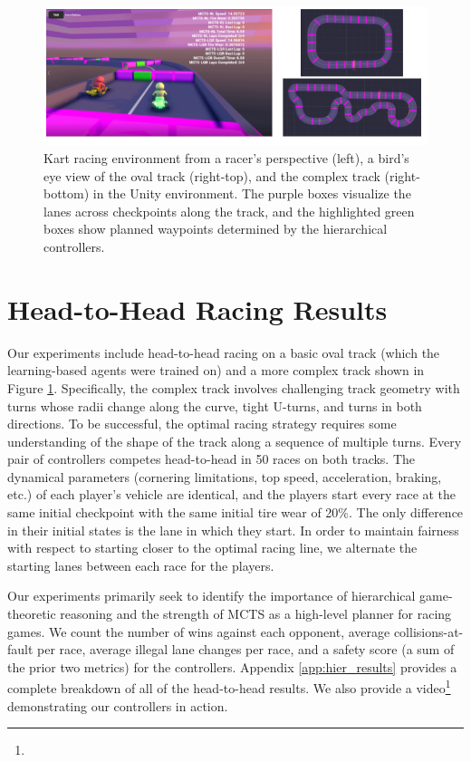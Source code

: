 \begin{figure}
  \centering
  \includegraphics[width=\textwidth]{Figures/UnityEnvironment.png}
  \caption[Screenshots of Unity simulation environment] {Kart racing environment from a racer's perspective (left), a bird's eye view of the oval track (right-top), and the complex track (right-bottom) in the Unity environment. The purple boxes visualize the lanes across checkpoints along the track, and the highlighted green boxes show planned waypoints determined by the hierarchical controllers.}
  \label{fig:experiment_tracks}
\end{figure}
\section{Head-to-Head Racing Results}
Our experiments include head-to-head racing on a basic oval track (which the learning-based agents were trained on) and a more complex track shown in Figure \ref{fig:experiment_tracks}. Specifically, the complex track involves challenging track geometry with turns whose radii change along the curve, tight U-turns, and turns in both directions. To be successful, the optimal racing strategy requires some understanding of the shape of the track along a sequence of multiple turns. Every pair of controllers competes head-to-head in 50 races on both tracks. The dynamical parameters (cornering limitations, top speed, acceleration, braking, etc.) of each player's vehicle are identical, and the players start every race at the same initial checkpoint with the same initial tire wear of 20\%. The only difference in their initial states is the lane in which they start. In order to maintain fairness with respect to starting closer to the optimal racing line, we alternate the starting lanes between each race for the players.

Our experiments primarily seek to identify the importance of hierarchical game-theoretic reasoning and the strength of MCTS as a high-level planner for racing games. We count the number of wins against each opponent, average collisions-at-fault per race, average illegal lane changes per race, and a safety score (a sum of the prior two metrics) for the controllers. Appendix \ref{app:hier_results} provides a complete breakdown of all of the head-to-head results. We also provide a video\footnote{\vidurl} demonstrating our controllers in action. 

